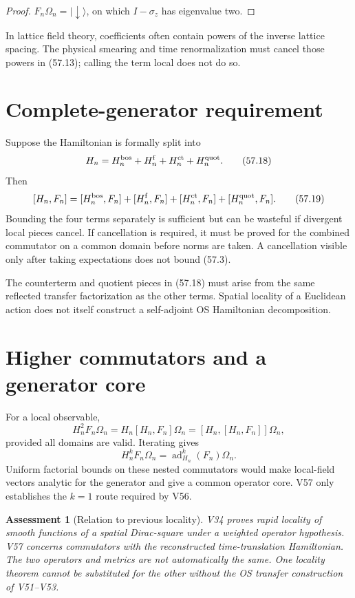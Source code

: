 \documentclass[11pt]{article}
\newtheorem{assessment}[theorem]{Assessment}
\theoremstyle{remark}
\begin{document}
\begin{proof}
\(F_n\Omega_n=|\!\downarrow\rangle\), on which
\(I-\sigma_z\) has eigenvalue two.
\end{proof}

In lattice field theory, coefficients often contain powers of the
inverse lattice spacing.  The physical smearing and time
renormalization must cancel those powers in (57.13); calling the
term local does not do so.

\section{Complete-generator requirement}

Suppose the Hamiltonian is formally split into
\[
 H_n=H_n^{\rm bos}+H_n^{\rm f}
 +H_n^{\rm ct}+H_n^{\rm quot}.                          \tag{57.18}
\]
Then
\[
 [H_n,F_n]=
 [H_n^{\rm bos},F_n]+[H_n^{\rm f},F_n]
 +[H_n^{\rm ct},F_n]+[H_n^{\rm quot},F_n].              \tag{57.19}
\]
Bounding the four terms separately is sufficient but can be
wasteful if divergent local pieces cancel.  If cancellation is
required, it must be proved for the combined commutator on a common
domain before norms are taken.  A cancellation visible only after
taking expectations does not bound (57.3).

The counterterm and quotient pieces in (57.18) must arise from the
same reflected transfer factorization as the other terms.  Spatial
locality of a Euclidean action does not itself construct a
self-adjoint OS Hamiltonian decomposition.

\section{Higher commutators and a generator core}

For a local observable,
\[
 H_n^2F_n\Omega_n
 =H_n[H_n,F_n]\Omega_n
 =[H_n,[H_n,F_n]]\Omega_n,                              \tag{57.20}
\]
provided all domains are valid.  Iterating gives
\[
 H_n^kF_n\Omega_n=\operatorname{ad}_{H_n}^k(F_n)\Omega_n.
                                                               \tag{57.21}
\]
Uniform factorial bounds on these nested commutators would make
local-field vectors analytic for the generator and give a common
operator core.  V57 only establishes the \(k=1\) route required by
V56.

\begin{assessment}[Relation to previous locality]
\label{ass:v15v57-relation}
V34 proves rapid locality of smooth functions of a spatial
Dirac-square under a weighted operator hypothesis.  V57 concerns
commutators with the reconstructed time-translation Hamiltonian.
The two operators and metrics are not automatically the same.
One locality theorem cannot be substituted for the other without
the OS transfer construction of V51--V53.
\end{assessment}
\end{document}
